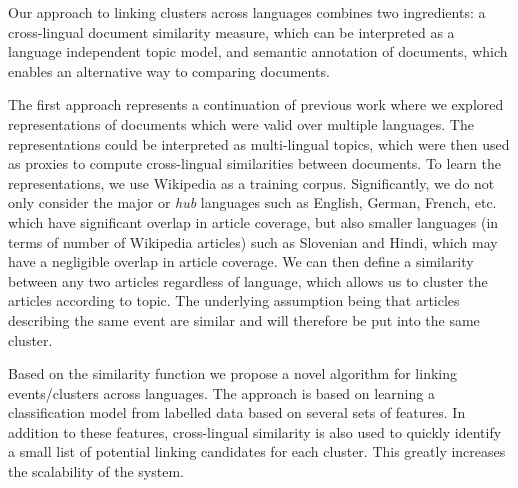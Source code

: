 \documentclass[twoside,11pt]{article}
\begin{document}
Our approach to linking clusters across languages combines two ingredients: a cross-lingual document similarity measure, which can be interpreted as a language independent topic model, and semantic annotation of documents, which enables an alternative way to comparing documents.

The first approach represents a continuation of previous work  where we explored representations of documents which were valid over multiple languages.  The representations could be interpreted as multi-lingual topics, which were then used as proxies to compute cross-lingual similarities between documents. To learn the representations, we use Wikipedia as a training corpus. Significantly, we do not only consider the major or \emph{hub} languages such as English, German, French, etc. which have significant overlap in article coverage, but also smaller languages (in terms of number of Wikipedia articles) such as Slovenian and Hindi, which may have a negligible overlap in article coverage. We can then define a similarity between any two articles regardless of language,  which allows us to cluster the articles according to topic. The underlying assumption being that articles describing the same event are similar  and will therefore be put into the same cluster.

Based on the similarity function we propose a novel algorithm for linking events/clusters across languages. The approach is based on learning a classification model from labelled data based on several sets of features. In addition to these features, cross-lingual similarity is also used to quickly identify a small list of potential linking candidates for each cluster.
This greatly increases the scalability of the system.
\end{document}

